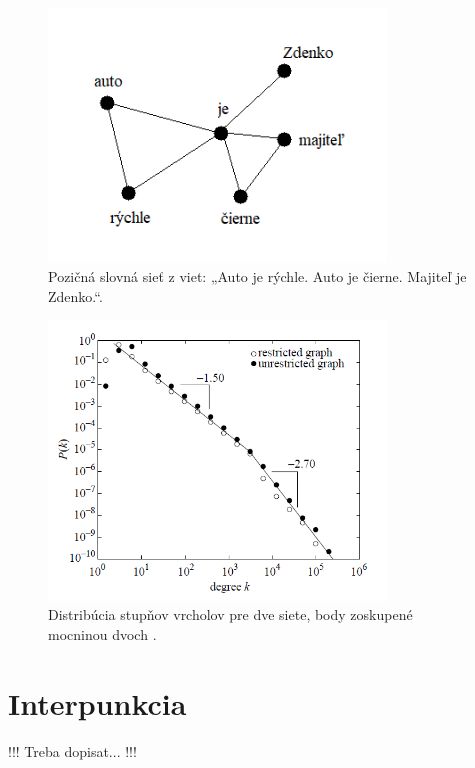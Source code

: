 \begin{figure}
    \centerline{\includegraphics[width=0.8\textwidth]{images/wan.png}}
    \caption[Pozičná slovná sieť.]{Pozičná slovná sieť z viet: „Auto je rýchle. Auto je čierne. Majiteľ je Zdenko.“.}
    \label{obr:wan}
\end{figure}

\begin{figure}
    \centerline{\includegraphics[width=0.8\textwidth]{images/degdist.png}}
    \caption[Distribúcia stupňov vrcholov.]{Distribúcia stupňov vrcholov pre dve siete, body zoskupené mocninou dvoch \cite{cancho2001small} .}
    \label{obr:degdist}
\end{figure}


\section{Interpunkcia}\label{sec:punctuation}

!!! Treba dopisat... !!!